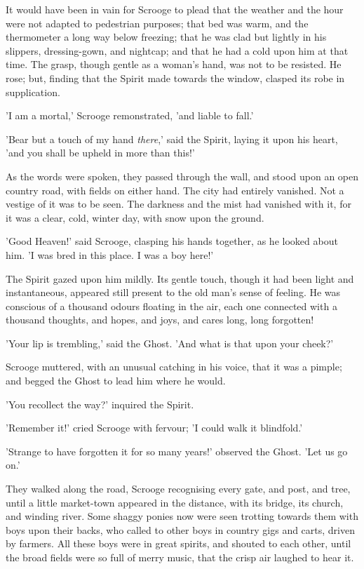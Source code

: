 It would have been in vain for Scrooge to plead that the weather and the
hour were not adapted to pedestrian purposes; that bed was warm, and the
thermometer a long way below freezing; that he was clad but lightly in
his slippers, dressing-gown, and nightcap; and that he had a cold upon
him at that time. The grasp, though gentle as a woman's hand, was not
to be resisted. He rose; but, finding that the Spirit made towards the
window, clasped its robe in supplication.

'I am a mortal,' Scrooge remonstrated, 'and liable to fall.'

'Bear but a touch of my hand \emph{there},' said the Spirit, laying it upon
his heart, 'and you shall be upheld in more than this!'

As the words were spoken, they passed through the wall, and stood upon
an open country road, with fields on either hand. The city had entirely
vanished. Not a vestige of it was to be seen. The darkness and the mist
had vanished with it, for it was a clear, cold, winter day, with snow
upon the ground.

'Good Heaven!' said Scrooge, clasping his hands together, as he looked
about him. 'I was bred in this place. I was a boy here!'

The Spirit gazed upon him mildly. Its gentle touch, though it had been
light and instantaneous, appeared still present to the old man's sense
of feeling. He was conscious of a thousand odours floating in the air,
each one connected with a thousand thoughts, and hopes, and joys, and
cares long, long forgotten!

'Your lip is trembling,' said the Ghost. 'And what is that upon your
cheek?'

Scrooge muttered, with an unusual catching in his voice, that it was a
pimple; and begged the Ghost to lead him where he would.

'You recollect the way?' inquired the Spirit.

'Remember it!' cried Scrooge with fervour; 'I could walk it blindfold.'

'Strange to have forgotten it for so many years!' observed the Ghost.
'Let us go on.'

They walked along the road, Scrooge recognising every gate, and post,
and tree, until a little market-town appeared in the distance, with its
bridge, its church, and winding river. Some shaggy ponies now were seen
trotting towards them with boys upon their backs, who called to other
boys in country gigs and carts, driven by farmers. All these boys were
in great spirits, and shouted to each other, until the broad fields were
so full of merry music, that the crisp air laughed to hear it.

